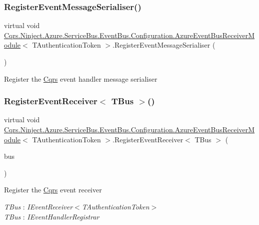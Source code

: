 \subsubsection{\texorpdfstring{Register\+Event\+Message\+Serialiser()}{RegisterEventMessageSerialiser()}}
{\footnotesize\ttfamily virtual void \hyperlink{classCqrs_1_1Ninject_1_1Azure_1_1ServiceBus_1_1EventBus_1_1Configuration_1_1AzureEventBusReceiverModule}{Cqrs.\+Ninject.\+Azure.\+Service\+Bus.\+Event\+Bus.\+Configuration.\+Azure\+Event\+Bus\+Receiver\+Module}$<$ T\+Authentication\+Token $>$.Register\+Event\+Message\+Serialiser (\begin{DoxyParamCaption}{ }\end{DoxyParamCaption})\hspace{0.3cm}{\ttfamily [virtual]}}



Register the \hyperlink{namespaceCqrs}{Cqrs} event handler message serialiser 

\mbox{\label{classCqrs_1_1Ninject_1_1Azure_1_1ServiceBus_1_1EventBus_1_1Configuration_1_1AzureEventBusReceiverModule_a67b8ec2c2762bf04c0568bead3d03cbf_a67b8ec2c2762bf04c0568bead3d03cbf}} 
\subsubsection{\texorpdfstring{Register\+Event\+Receiver$<$ T\+Bus $>$()}{RegisterEventReceiver< TBus >()}}
{\footnotesize\ttfamily virtual void \hyperlink{classCqrs_1_1Ninject_1_1Azure_1_1ServiceBus_1_1EventBus_1_1Configuration_1_1AzureEventBusReceiverModule}{Cqrs.\+Ninject.\+Azure.\+Service\+Bus.\+Event\+Bus.\+Configuration.\+Azure\+Event\+Bus\+Receiver\+Module}$<$ T\+Authentication\+Token $>$.Register\+Event\+Receiver$<$ T\+Bus $>$ (\begin{DoxyParamCaption}\item[{T\+Bus}]{bus }\end{DoxyParamCaption})\hspace{0.3cm}{\ttfamily [virtual]}}



Register the \hyperlink{namespaceCqrs}{Cqrs} event receiver 

\begin{Desc}
\item[Type Constraints]\begin{description}
\item[{\em T\+Bus} : {\em I\+Event\+Receiver$<$T\+Authentication\+Token$>$}]\item[{\em T\+Bus} : {\em I\+Event\+Handler\+Registrar}]\end{description}
\end{Desc}
